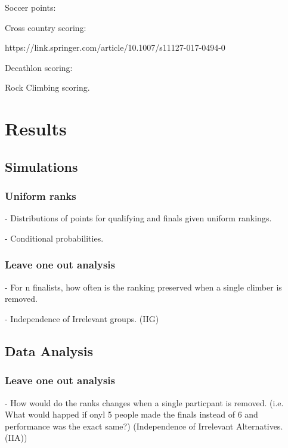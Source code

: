 \documentclass{article}\usepackage[]{graphicx}\usepackage[]{color}
\begin{document}
Soccer points: %

Cross country scoring: %

https://link.springer.com/article/10.1007/s11127-017-0494-0\cite{BoudreauEtAl2018}

Decathlon scoring: %

Rock Climbing scoring.  

\section{Results}

\subsection{Simulations}
\subsubsection{Uniform ranks}

- Distributions of points for qualifying and finals given uniform rankings. 

- Conditional probabilities.  

\subsubsection{Leave one out analysis} 

- For n finalists, how often is the ranking preserved when a single climber is removed.

- Independence of Irrelevant groups.  (IIG)


\subsection{Data Analysis} 
\subsubsection{Leave one out analysis} 

- How would do the ranks changes when a single particpant is removed.  (i.e. What would happed if onyl 5 people made the finals instead of 6 and performance was the exact same?) (Independence of Irrelevant Alternatives.  (IIA))
\end{document}
